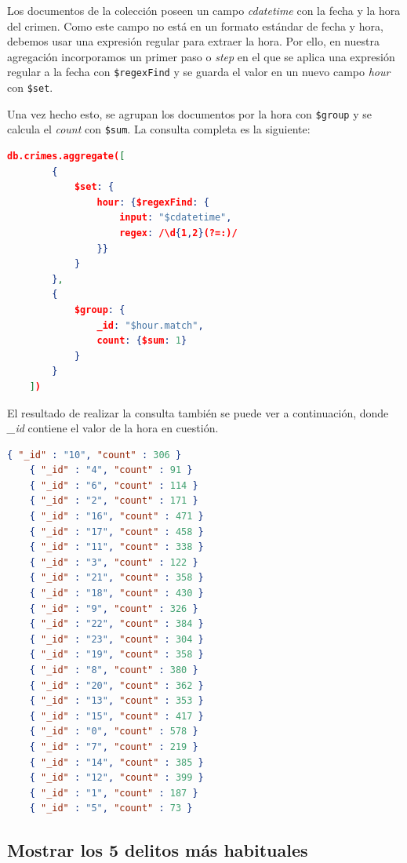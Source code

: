 \documentclass{article}
\begin{document}
Los documentos de la colección poseen un campo \textit{cdatetime} con la fecha y
la hora del crimen. Como este campo no está en un formato estándar de fecha y
hora, debemos usar una expresión regular para extraer la hora. Por ello, en
nuestra agregación incorporamos un primer paso o \textit{step} en el que se
aplica una expresión regular a la fecha con \texttt{\$regexFind} y se guarda el
valor en un nuevo campo \textit{hour} con \texttt{\$set}.

Una vez hecho esto, se agrupan los documentos por la hora con \texttt{\$group} y
se calcula el \textit{count} con \texttt{\$sum}. La consulta completa es la
siguiente:

\begin{lstlisting}[language=JSON]
    db.crimes.aggregate([
        {
            $set: {
                hour: {$regexFind: {
                    input: "$cdatetime",
                    regex: /\d{1,2}(?=:)/
                }}
            }
        },
        {
            $group: {
                _id: "$hour.match",
                count: {$sum: 1}
            }
        }
    ])
\end{lstlisting}

El resultado de realizar la consulta también se puede ver a continuación, donde
\textit{\_id} contiene el valor de la hora en cuestión.

\begin{lstlisting}[language=JSON]
    { "_id" : "10", "count" : 306 }
    { "_id" : "4", "count" : 91 }
    { "_id" : "6", "count" : 114 }
    { "_id" : "2", "count" : 171 }
    { "_id" : "16", "count" : 471 }
    { "_id" : "17", "count" : 458 }
    { "_id" : "11", "count" : 338 }
    { "_id" : "3", "count" : 122 }
    { "_id" : "21", "count" : 358 }
    { "_id" : "18", "count" : 430 }
    { "_id" : "9", "count" : 326 }
    { "_id" : "22", "count" : 384 }
    { "_id" : "23", "count" : 304 }
    { "_id" : "19", "count" : 358 }
    { "_id" : "8", "count" : 380 }
    { "_id" : "20", "count" : 362 }
    { "_id" : "13", "count" : 353 }
    { "_id" : "15", "count" : 417 }
    { "_id" : "0", "count" : 578 }
    { "_id" : "7", "count" : 219 }
    { "_id" : "14", "count" : 385 }
    { "_id" : "12", "count" : 399 }
    { "_id" : "1", "count" : 187 }
    { "_id" : "5", "count" : 73 }
\end{lstlisting}

\subsection{Mostrar los 5 delitos más habituales}
\end{document}
